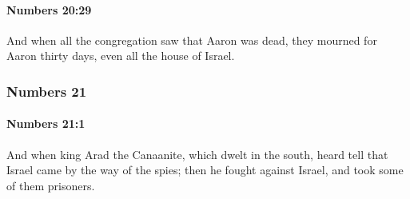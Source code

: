 		\paragraph{Numbers 20:29} %
			\label{NUMBERS-20-29}

			And when all the congregation saw that Aaron was dead, they mourned for Aaron thirty days, even all the house of Israel.

	\subsubsection{Numbers 21} %
		\label{NUMBERS-21}

		\paragraph{Numbers 21:1} %
			\label{NUMBERS-21-1}

			And when king Arad the Canaanite, which dwelt in the south, heard tell that Israel came by the way of the spies; then he fought against Israel, and took some of them prisoners.

